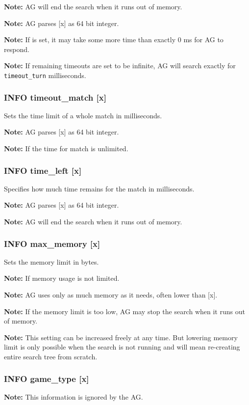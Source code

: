 \documentclass[12pt,a4paper]{article}
\begin{document}
\textbf{Note:} AG will end the search when it runs out of memory.

\textbf{Note:} AG parses [x] as 64 bit integer.

\textbf{Note:} If  is set, it may take some more time than exactly 0 ms for AG to respond.

\textbf{Note:} If remaining timeouts are set to be infinite, AG will search exactly for \texttt{timeout{\_}turn} milliseconds.

\subsubsection{INFO timeout{\_}match [x]}
\label{cmd_timeout_match}
Sets the time limit of a whole match in milliseconds.

\textbf{Note:} AG parses [x] as 64 bit integer.

\textbf{Note:} If  the time for match is unlimited.

\subsubsection{INFO time{\_}left [x]}
\label{cmd_info_time_left}
Specifies how much time remains for the match in milliseconds.

\textbf{Note:} AG parses [x] as 64 bit integer.

\textbf{Note:} AG will end the search when it runs out of memory.

\subsubsection{INFO max{\_}memory [x]}
\label{cmd_info_max_memory}
Sets the memory limit in bytes.

\textbf{Note:} If  memory usage is not limited.

\textbf{Note:} AG uses only as much memory as it needs, often lower than [x].

\textbf{Note:} If the memory limit is too low, AG may stop the search when it runs out of memory.

\textbf{Note:} This setting can be increased freely at any time. But lowering memory limit is only possible when the search is not running and will mean re-creating entire search tree from scratch.

\subsubsection{INFO game{\_}type [x]}
\label{cmd_info_game_type}
\textbf{Note:} This information is ignored by the AG.
\end{document}
